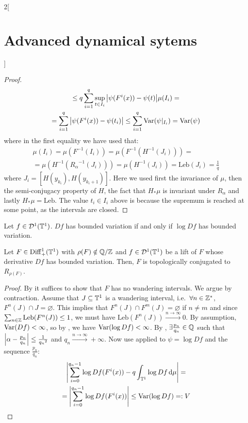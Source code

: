 \documentclass[../../../main_math.tex]{subfiles}
\begin{document}
\begin{multicols}{2}[\section{Advanced dynamical sytems}]
\begin{proof}
\begin{multline*}
      \leq q \sum_{i=1}^q \sup_{t\in I_i}\abs{\psi(F^i(x))-\psi(t)}\mu(I_i)=\\
      =\sum_{i=1}^q \abs{\psi(F^i(x))-\psi(t_i)}\leq \sum_{i=1}^q \mathrm{Var}(\psi|_{I_i})= \mathrm{Var}(\psi)
    \end{multline*}
    where in the first equality we have used that:
    \begin{multline*}
      \mu(I_i)=\mu(F^{-1}(I_i))=\mu(F^{-1}(H^{-1}(J_i)))=\\=\mu(H^{-1}({R_\alpha}^{-1}(J_i)))=\mu(H^{-1}(J_i))=\text{Leb}(J_i)=\frac{1}{q}
    \end{multline*}
    where $J_i=[H(y_{k_i}),H(y_{{k_i}+1})]$. Here we used first the invariance of $\mu$, then the semi-conjugacy property of $H$, the fact that $H_*\mu$ is invariant under $R_\alpha$ and lastly $H_*\mu = \text{Leb}$. The value $t_i\in I_i$ above is because the supremum is reached at some point, as the intervals are closed.
  \end{proof}
  \begin{lemma}\label{ADS:lema_var_log}
    Let $f\in \mathcal{D}^1(\mathbb{T}^1)$. $Df$ has bounded variation if and only if $\log Df$ has bounded variation.
  \end{lemma}
  \begin{theorem}
    Let $F\in \mathrm{Diff}_+^1(\mathbb{T}^1)$ with $\rho(F)\notin\quot{\QQ}{\ZZ}$ and $f\in\mathcal{D}^1(\mathbb{T}^1)$ be a lift of $F$ whose derivative $Df$ has bounded variation. Then, $F$ is topologically conjugated to $R_{\rho(F)}$.
  \end{theorem}
  \begin{proof}
    By  it suffices to show that $F$ has no wandering intervals. We argue by contraction. Assume that $J\subseteq \mathbb{T}^1$ is a wandering interval, i.e.\ $\forall n\in\mathbb{Z}^*$, $F^n(J)\cap J=\varnothing$. This implies that $F^n(J) \cap F^m(J)=\varnothing$ if $n\ne m$ and since $\sum_{n\in\mathbb{Z}}\text{Leb}(F^n(J))\leq 1$, we must have $\text{Leb}(F^n(J))\overset{n\to\infty}{\longrightarrow}0$. By assumption, $\mathrm{Var}(Df)<\infty$, so by , we have $\mathrm{Var}(\log Df) < \infty$.
    By , $\exists \frac{p_n}{q_n}\in\mathbb{Q}$ such that $\abs{\alpha-\frac{p_n}{q_n}}\leq \frac{1}{{q_n}^2}$ and $q_n\overset{n\to\infty}{\longrightarrow}+\infty$. Now use  applied to $\psi=\log Df$ and the sequence $\frac{p_n}{q_n}$:
    \begin{multline*}
      \abs{\sum_{i=0}^{q_n-1}\log Df(F^i(x))-q\int_{\TT^1}\log Df\dd{\mu}}=\\=\abs{\sum_{i=0}^{q_n-1}\log Df(F^i(x))}\leq\Var(\log Df)=:V

\end{multline*}
\end{proof}
\end{multicols}
\end{document}
